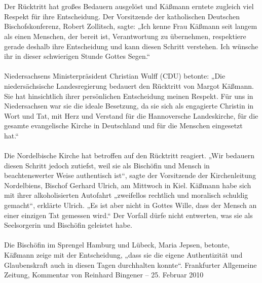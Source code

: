\documentclass[a4paper,12pt,oneside]{scrbook}
\begin{document}
\\\\
Der Rücktritt hat großes Bedauern ausgelöst und Käßmann erntete zugleich viel Respekt für ihre Entscheidung. Der Vorsitzende der katholischen Deutschen Bischofskonferenz, Robert Zollitsch, sagte: „Ich kenne Frau Käßmann seit langem als einen Menschen, der bereit ist, Verantwortung zu übernehmen, respektiere gerade deshalb ihre Entscheidung und kann diesen Schritt verstehen. Ich wünsche ihr in dieser schwierigen Stunde Gottes Segen.“
\\\\
Niedersachsens Ministerpräsident Christian Wulff (CDU) betonte: „Die niedersächsische Landesregierung bedauert den Rücktritt von Margot Käßmann. Sie hat hinsichtlich ihrer persönlichen Entscheidung meinen Respekt. Für uns in Niedersachsen war sie die ideale Besetzung, da sie sich als engagierte Christin in Wort und Tat, mit Herz und Verstand für die Hannoversche Landeskirche, für die gesamte evangelische Kirche in Deutschland und für die Menschen eingesetzt hat.“
\\\\
Die Nordelbische Kirche hat betroffen auf den Rücktritt reagiert. „Wir bedauern diesen Schritt jedoch zutiefst, weil sie als Bischöfin und Mensch in beachtenswerter Weise authentisch ist“, sagte der Vorsitzende der Kirchenleitung Nordelbiens, Bischof Gerhard Ulrich, am Mittwoch in Kiel. Käßmann habe sich mit ihrer alkoholisierten Autofahrt „zweifellos rechtlich und moralisch schuldig gemacht“, erklärte Ulrich. „Es ist aber nicht in Gottes Wille, dass der Mensch an einer einzigen Tat gemessen wird.“ Der Vorfall dürfe nicht entwerten, was sie als Seelsorgerin und Bischöfin geleistet habe.
\\\\
Die Bischöfin im Sprengel Hamburg und Lübeck, Maria Jepsen, betonte, Käßmann zeige mit der Entscheidung, „dass sie die eigene Authentizität und Glaubenskraft auch in diesen Tagen durchhalten konnte“.
\newpage
Frankfurter Allgemeine Zeitung, Kommentar von Reinhard Bingener \hfill -- \hfill 25. Februar 2010
\end{document}
